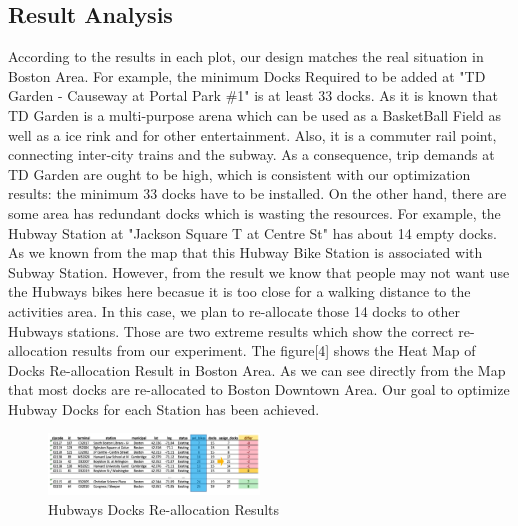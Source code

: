 \documentclass[journal, letterpaper]{IEEEtran}
\begin{document}
\subsection{Result Analysis}
According to the results in each plot, our design matches the real situation in Boston Area. For example, the minimum Docks Required to be added at "TD Garden - Causeway at Portal Park \#1" is at least 33 docks. As it is known that TD Garden is a multi-purpose arena which can be used as a BasketBall Field as well as a ice rink and for other entertainment. Also, it is a commuter rail point, connecting inter-city trains and the subway. As a consequence, trip demands at TD Garden are ought to be high, which is consistent with our optimization results: the minimum 33 docks have to be installed. On the other hand, there are some area has redundant docks which is wasting the resources. For example, the Hubway Station at "Jackson Square T at Centre St" has about 14 empty docks. As we known from the map that this Hubway Bike Station is associated with Subway Station. However, from the result we know that people may not want use the Hubways bikes here becasue it is too close for a walking distance to the activities area. In this case, we plan to re-allocate those 14 docks to other Hubways stations. Those are two extreme results which show the correct re-allocation results from our experiment. The figure[4] shows the Heat Map of Docks Re-allocation Result in Boston Area. As we can see directly from the Map that most docks are re-allocated to Boston Downtown Area. Our goal to optimize Hubway Docks for each Station has been achieved.

\begin{figure}
  \includegraphics[width=0.5\textwidth]{resultsheet.jpg}
  \caption{Hubways Docks Re-allocation Results}
  \label{fig:3}
\end{figure}   
\end{document}
